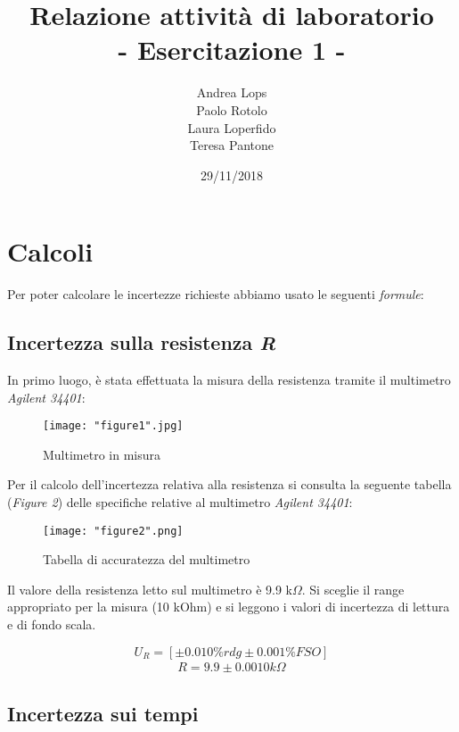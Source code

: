 \documentclass[a4paper]{article}
\title{\textbf{Relazione attività di laboratorio}\\ {\normalsize - Esercitazione 1 -}}
\author{Andrea Lops\\
		Paolo Rotolo\\
		Laura Loperfido\\
		Teresa Pantone}
\date{29/11/2018}
\begin{document}
\maketitle

\section{Calcoli}

Per poter calcolare le incertezze richieste abbiamo usato le seguenti \emph{formule}:\\ 


\subsection {Incertezza sulla resistenza \emph{R}}

In primo luogo, è stata effettuata la misura della resistenza tramite il multimetro \emph{Agilent 34401}:

\begin{figure}[htp]
\centering
\texttt{[image: "figure1".jpg]}
\caption{Multimetro in misura}
\label{}
\end{figure}
\noindent 
Per il calcolo dell'incertezza relativa alla resistenza si consulta la seguente tabella (\emph{Figure 2}) delle specifiche relative al multimetro \emph{Agilent 34401}:
\begin{center}
\begin{figure}[htp]
\centering
\texttt{[image: "figure2".png]}
\caption{Tabella di accuratezza del multimetro}
\label{a}
\end{figure}
\end{center}

Il valore della resistenza letto sul multimetro è  9.9 k$\Omega$. Si sceglie il range appropriato per la misura (10 kOhm) e si leggono i valori di incertezza di lettura e di fondo scala.

\begin{Large} 
	\begin{equation} U_{R} = [\pm 0.010\%rdg \pm 0.001\% FSO]
	 \end{equation}
	 \begin{eqnarray*} R = 9.9 \pm 0.0010 k\Omega \end{eqnarray*}
\end{Large}

\subsection {Incertezza sui tempi}
\end{document}
